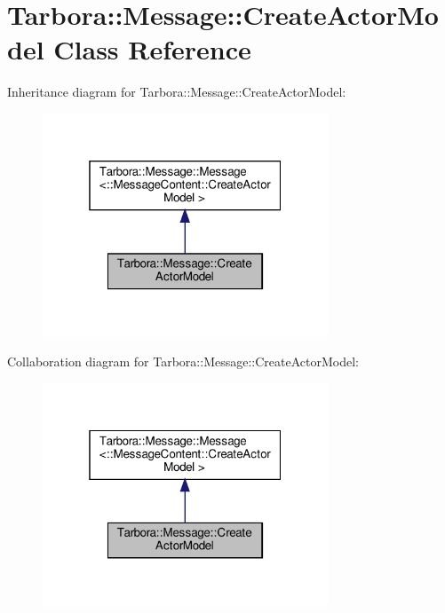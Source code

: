 \hypertarget{classTarbora_1_1Message_1_1CreateActorModel}{}\section{Tarbora\+:\+:Message\+:\+:Create\+Actor\+Model Class Reference}
\label{classTarbora_1_1Message_1_1CreateActorModel}


Inheritance diagram for Tarbora\+:\+:Message\+:\+:Create\+Actor\+Model\+:\nopagebreak
\begin{figure}[H]
\begin{center}
\leavevmode
\includegraphics[width=241pt]{classTarbora_1_1Message_1_1CreateActorModel__inherit__graph}
\end{center}
\end{figure}


Collaboration diagram for Tarbora\+:\+:Message\+:\+:Create\+Actor\+Model\+:\nopagebreak
\begin{figure}[H]
\begin{center}
\leavevmode
\includegraphics[width=241pt]{classTarbora_1_1Message_1_1CreateActorModel__coll__graph}
\end{center}
\end{figure}
